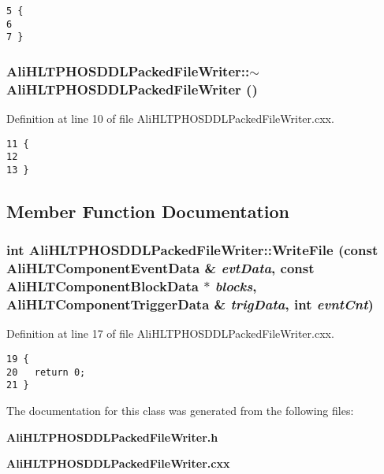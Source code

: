 \footnotesize\begin{verbatim}5 {
6 
7 }
\end{verbatim}\normalsize 


\subsubsection{\setlength{\rightskip}{0pt plus 5cm}Ali\-HLTPHOSDDLPacked\-File\-Writer::$\sim${\bf Ali\-HLTPHOSDDLPacked\-File\-Writer} ()}\label{classAliHLTPHOSDDLPackedFileWriter_a1}




Definition at line 10 of file Ali\-HLTPHOSDDLPacked\-File\-Writer.cxx.

\footnotesize\begin{verbatim}11 {
12 
13 }
\end{verbatim}\normalsize 




\subsection{Member Function Documentation}
\subsubsection{\setlength{\rightskip}{0pt plus 5cm}int Ali\-HLTPHOSDDLPacked\-File\-Writer::Write\-File (const {\bf Ali\-HLTComponent\-Event\-Data} \& {\em evt\-Data}, const {\bf Ali\-HLTComponent\-Block\-Data} $\ast$ {\em blocks}, {\bf Ali\-HLTComponent\-Trigger\-Data} \& {\em trig\-Data}, int {\em evnt\-Cnt})\hspace{0.3cm}{\tt  [virtual]}}\label{classAliHLTPHOSDDLPackedFileWriter_a2}




Definition at line 17 of file Ali\-HLTPHOSDDLPacked\-File\-Writer.cxx.

\footnotesize\begin{verbatim}19 {
20   return 0;
21 }
\end{verbatim}\normalsize 




The documentation for this class was generated from the following files:\begin{CompactItemize}
\item 
{\bf Ali\-HLTPHOSDDLPacked\-File\-Writer.h}\item 
{\bf Ali\-HLTPHOSDDLPacked\-File\-Writer.cxx}\end{CompactItemize}
